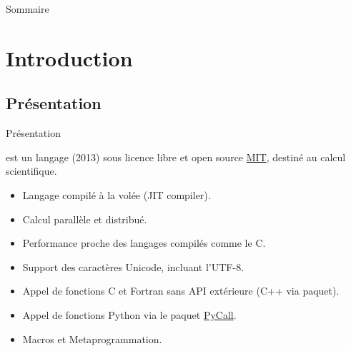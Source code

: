\maketitle
\begin{frame}{Sommaire}
    \begin{multicols}{2}
        \tableofcontents[sectionstyle=show/show, subsectionstyle=hide/hide/hide, subsubsectionstyle=hide/hide/hide, sections={1-5}]
        \columnbreak
        \tableofcontents[sectionstyle=show/show, subsectionstyle=hide/hide/hide, subsubsectionstyle=hide/hide/hide, sections={6-10}]
    \end{multicols}
\end{frame}


\section{Introduction}
\subsection{Présentation}
\begin{frame}{Présentation}
    \par{{\Julia} est un langage (2013) sous licence libre et open source \href{https://github.com/JuliaLang/julia/blob/master/LICENSE.md}{MIT}, destiné au calcul scientifique.}
    \begin{itemize}
        \item Langage compilé à la volée (JIT compiler).
        \item Calcul parallèle et distribué.
        \item Performance proche des langages compilés comme le C.
        \item Support des caractères Unicode, incluant l'UTF-8.
        \item Appel de fonctions C et Fortran sans API extérieure (C++ via paquet).
        \item Appel de fonctions Python via le paquet \href{https://github.com/stevengj/PyCall.jl}{PyCall}.
        \item Macros et Metaprogrammation.
    \end{itemize}
\end{frame}

